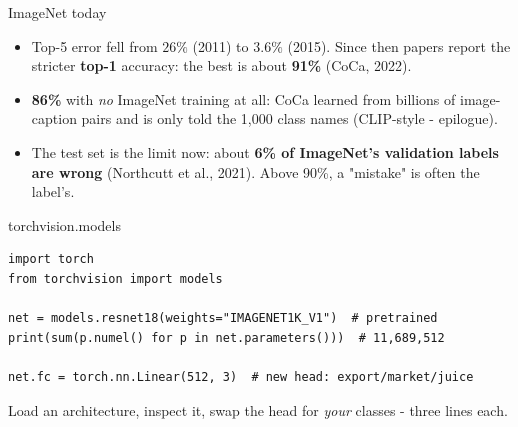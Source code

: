 \documentclass[aspectratio=169]{beamer}
\begin{document}
\begin{frame}{ImageNet today}
  \begin{itemize}
    \item Top-5 error fell from $26\%$ (2011) to $3.6\%$ (2015). Since then papers report the
      stricter \textbf{top-1} accuracy: the best is about \textbf{91\%} (CoCa, 2022).
    \item \textbf{86\%} with \emph{no} ImageNet training at all: CoCa learned from billions of
      image-caption pairs and is only told the 1{,}000 class names (CLIP-style - epilogue).
    \item The test set is the limit now: about \textbf{6\% of ImageNet's validation labels are
      wrong} (Northcutt et al., 2021). Above 90\%, a "mistake" is often the label's.
  \end{itemize}
  \vskip 6pt
\end{frame}

\begin{frame}[fragile]{torchvision.models}
\begin{lstlisting}
import torch
from torchvision import models

net = models.resnet18(weights="IMAGENET1K_V1")  # pretrained
print(sum(p.numel() for p in net.parameters()))  # 11,689,512

net.fc = torch.nn.Linear(512, 3)  # new head: export/market/juice
\end{lstlisting}
  \vskip 4pt
  Load an architecture, inspect it, swap the head for \emph{your} classes - three
  lines each.
  \vskip 4pt
  \vskip 2pt
  \begin{center}
    \href{https://docs.pytorch.org/vision/stable/models.html}{}
  \end{center}
\end{frame}
\end{document}
